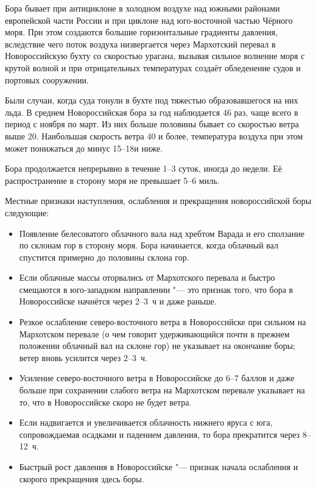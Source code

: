 Бора бывает при антициклоне в холодном воздухе над южными районами
европейской части России и при циклоне над юго-восточной частью
Чёрного моря. При этом создаются большие горизонтальные градиенты
давления, вследствие чего поток воздуха низвергается через Мархотский
перевал в Новороссийскую бухту со скоростью урагана, вызывая сильное
волнение моря с крутой волной и при отрицательных температурах создаёт
обледенение судов и портовых сооружении.

Были случаи, когда суда тонули в бухте под тяжестью образовавшегося на
них льда. В среднем Новороссийская бора за год наблюдается 46 раз,
чаще всего в период с ноября по март. Из них больше половины бывает со
скоростью ветра выше 20\speedms. Наибольшая скорость ветра 40\speedms
и более, температура воздуха при этом может понижаться до минус
15--18\grC и ниже.

Бора продолжается непрерывно в течение 1--3 суток, иногда до недели. Её
распространение в сторону моря не превышает 5--6 миль.

Местные признаки наступления, ослабления и прекращения новороссийской
боры следующие:
\begin{itemize}
\item Появление белесоватого облачного вала над хребтом Варада и его
  сползание по склонам гор в сторону моря. Бора начинается, когда
  облачный вал спустится примерно до половины склона гор.
\item Если облачные массы оторвались от Мархотского перевала и быстро
  смещаются в юго-западном направлении "--- это признак того, что бора в
  Новороссийске начнётся через 2--3~ч и даже раньше.
\item Резкое ослабление северо-восточного ветра в Новороссийске при
  сильном на Мархотском перевале (о чем говорит удерживающийся почти в
  прежнем положении облачный вал на склоне гор) не указывает на
  окончание боры; ветер вновь усилится через 2--3~ч.
\item Усиление северо-восточного ветра в Новороссийске до 6--7 баллов и
  даже больше при сохранении слабого ветра на Мархотском перевале
  указывает на то, что в Новороссийске скоро не будет ветра.
\item Если надвигается и увеличивается облачность нижнего яруса с юга,
  сопровождаемая осадками и падением давления, то бора прекратится
  через 8--12~ч.
\item Быстрый рост давления в Новороссийске "--- признак начала ослабления
  и скорого прекращения здесь боры.
\end{itemize}
  
